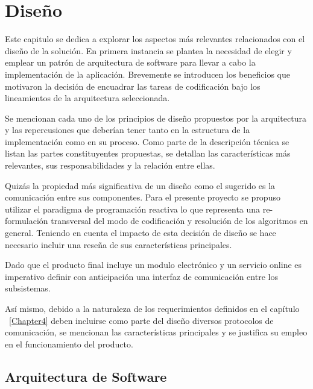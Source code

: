 
\chapter{Diseño} %

\label{Chapter5} %

Este capitulo se dedica a explorar los aspectos más relevantes relacionados con el diseño de la solución.
En primera instancia se plantea la necesidad de elegir y emplear un patrón de arquitectura de software 
para llevar a cabo la implementación de la aplicación. Brevemente se introducen los beneficios que motivaron la decisión de 
encuadrar las tareas de codificación bajo los lineamientos de la arquitectura seleccionada.

Se mencionan cada uno de los principios de diseño propuestos por la arquitectura y las repercusiones que deberían tener tanto en la estructura de la implementación como en su proceso.
Como parte de la descripción técnica se listan las partes constituyentes propuestas, se detallan las características más relevantes, sus responsabilidades y la relación entre ellas.

Quizás la propiedad más significativa de un diseño como el sugerido es la comunicación entre sus componentes.
Para el presente proyecto se propuso utilizar el paradigma de programación reactiva lo que representa una re-formulación
transversal del modo de codificación y resolución de los algoritmos en general. 
Teniendo en cuenta el impacto de esta decisión de diseño se hace necesario incluir una reseña de sus características principales.

Dado que el producto final incluye un modulo electrónico y un servicio online es imperativo definir con anticipación una interfaz de comunicación entre los subsistemas.

Así mismo, debido a la naturaleza de los requerimientos definidos en el capítulo ~\ref{Chapter4} deben incluirse como parte del diseño diversos protocolos de comunicación, se mencionan las características principales y se justifica su empleo en el funcionamiento del producto.

\section{Arquitectura de Software}

